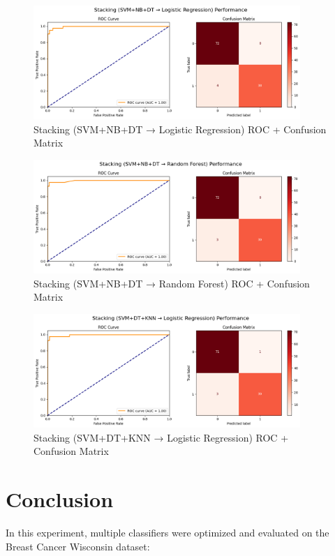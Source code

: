 \documentclass[12pt]{article}
\begin{document}
\begin{figure}[H]
\centering
\includegraphics[width=0.9\textwidth]{images/stack1.png}
\caption{Stacking (SVM+NB+DT → Logistic Regression) ROC + Confusion Matrix}
\end{figure}

\begin{figure}[H]
\centering
\includegraphics[width=0.9\textwidth]{images/stack2.png}
\caption{Stacking (SVM+NB+DT → Random Forest) ROC + Confusion Matrix}
\end{figure}

\begin{figure}[H]
\centering
\includegraphics[width=0.9\textwidth]{images/stack3.png}
\caption{Stacking (SVM+DT+KNN → Logistic Regression) ROC + Confusion Matrix}
\end{figure}

\section*{Conclusion}
In this experiment, multiple classifiers were optimized and evaluated on the Breast Cancer Wisconsin dataset:
\end{document}

